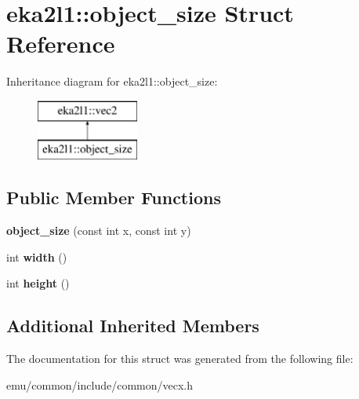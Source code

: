 \hypertarget{structeka2l1_1_1object__size}{}\section{eka2l1\+:\+:object\+\_\+size Struct Reference}
\label{structeka2l1_1_1object__size}
Inheritance diagram for eka2l1\+:\+:object\+\_\+size\+:\begin{figure}[H]
\begin{center}
\leavevmode
\includegraphics[height=2.000000cm]{structeka2l1_1_1object__size}
\end{center}
\end{figure}
\subsection*{Public Member Functions}
\begin{DoxyCompactItemize}
\item 
\mbox{\label{structeka2l1_1_1object__size_afa6b35a3cc661948f190317ca7201c18}} 
{\bfseries object\+\_\+size} (const int x, const int y)
\item 
\mbox{\label{structeka2l1_1_1object__size_a0cbaad7533d144b0a997936cbbc2bc7e}} 
int {\bfseries width} ()
\item 
\mbox{\label{structeka2l1_1_1object__size_a6ec38228fa9174c71a64572007c561f4}} 
int {\bfseries height} ()
\end{DoxyCompactItemize}
\subsection*{Additional Inherited Members}


The documentation for this struct was generated from the following file\+:\begin{DoxyCompactItemize}
\item 
emu/common/include/common/vecx.\+h\end{DoxyCompactItemize}
